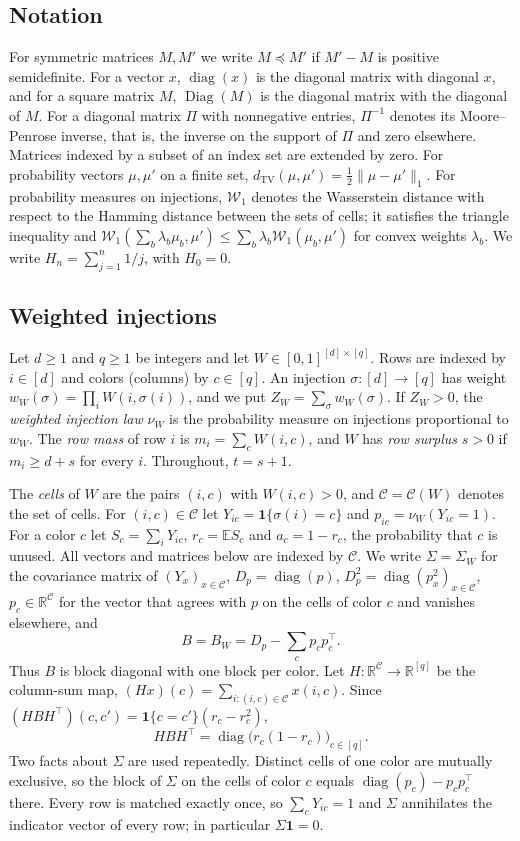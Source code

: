 \documentclass{amsart}
\numberwithin{equation}{section}
\theoremstyle{plain}
\theoremstyle{definition}
\theoremstyle{remark}
\newcommand{\E}{\mathbb{E}}
\newcommand{\R}{\mathbb{R}}
\newcommand{\diag}{\operatorname{diag}}
\newcommand{\Diag}{\operatorname{Diag}}
\newcommand{\dTV}{d_{\mathrm{TV}}}
\newcommand{\cC}{\mathcal{C}}
\newcommand{\T}{\top}
\newcommand{\one}{\mathbf{1}}
\begin{document}
\subsection{Notation}
For symmetric matrices $M,M'$ we write $M\preceq M'$ if $M'-M$ is positive semidefinite. For a vector $x$, $\diag(x)$ is the diagonal matrix with diagonal $x$, and for a square matrix $M$, $\Diag(M)$ is the diagonal matrix with the diagonal of $M$. For a diagonal matrix $\Pi$ with nonnegative entries, $\Pi^{-1}$ denotes its Moore--Penrose inverse, that is, the inverse on the support of $\Pi$ and zero elsewhere. Matrices indexed by a subset of an index set are extended by zero. For probability vectors $\mu,\mu'$ on a finite set, $\dTV(\mu,\mu')=\frac12\|\mu-\mu'\|_1$. For probability measures on injections, $\mathcal W_1$ denotes the Wasserstein distance with respect to the Hamming distance between the sets of cells; it satisfies the triangle inequality and $\mathcal W_1(\sum_b\lambda_b\mu_b,\mu')\le\sum_b\lambda_b\mathcal W_1(\mu_b,\mu')$ for convex weights $\lambda_b$. We write $H_n=\sum_{j=1}^n1/j$, with $H_0=0$.

\subsection{Weighted injections}
Let $d\ge1$ and $q\ge1$ be integers and let $W\in[0,1]^{[d]\times[q]}$. Rows are indexed by $i\in[d]$ and colors (columns) by $c\in[q]$. An injection $\sigma\colon[d]\to[q]$ has weight $w_W(\sigma)=\prod_iW(i,\sigma(i))$, and we put $Z_W=\sum_\sigma w_W(\sigma)$. If $Z_W>0$, the \emph{weighted injection law} $\nu_W$ is the probability measure on injections proportional to $w_W$. The \emph{row mass} of row $i$ is $m_i=\sum_cW(i,c)$, and $W$ has \emph{row surplus} $s>0$ if $m_i\ge d+s$ for every $i$. Throughout, $t=s+1$.

The \emph{cells} of $W$ are the pairs $(i,c)$ with $W(i,c)>0$, and $\cC=\cC(W)$ denotes the set of cells. For $(i,c)\in\cC$ let $Y_{ic}=\one\{\sigma(i)=c\}$ and $p_{ic}=\nu_W(Y_{ic}=1)$. For a color $c$ let $S_c=\sum_iY_{ic}$, $r_c=\E S_c$ and $a_c=1-r_c$, the probability that $c$ is unused. All vectors and matrices below are indexed by $\cC$. We write $\Sigma=\Sigma_W$ for the covariance matrix of $(Y_x)_{x\in\cC}$, $D_p=\diag(p)$, $D_p^2=\diag(p_x^2)_{x\in\cC}$, $p_c\in\R^{\cC}$ for the vector that agrees with $p$ on the cells of color $c$ and vanishes elsewhere, and
\[
B=B_W=D_p-\sum_cp_cp_c^\T .
\]
Thus $B$ is block diagonal with one block per color. Let $H\colon\R^{\cC}\to\R^{[q]}$ be the column-sum map, $(Hx)(c)=\sum_{i:(i,c)\in\cC}x(i,c)$. Since $(HBH^\T)(c,c')=\one\{c=c'\}(r_c-r_c^2)$,
\begin{equation}\label{eq:HBH}
HBH^\T=\diag\bigl(r_c(1-r_c)\bigr)_{c\in[q]}.
\end{equation}
Two facts about $\Sigma$ are used repeatedly. Distinct cells of one color are mutually exclusive, so the block of $\Sigma$ on the cells of color $c$ equals $\diag(p_c)-p_cp_c^\T$ there. Every row is matched exactly once, so $\sum_cY_{ic}=1$ and $\Sigma$ annihilates the indicator vector of every row; in particular $\Sigma\one=0$.
\end{document}
